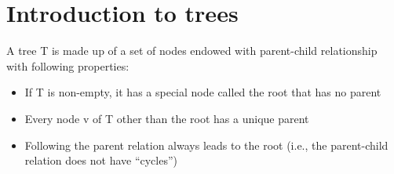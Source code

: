 \documentclass[12pt]{article}
\newcommand{\1}{\space \quad}
\newcommand{\2}{\quad \quad \quad}
\newcommand{\3}{\quad \quad \quad \quad \space}
\newcommand{\4}{\quad \quad \quad \quad \quad \quad}
\begin{document}
\section{Introduction to trees}
A tree T is made up of a set of nodes endowed with parent-child relationship with following properties:
\begin{itemize}
  \item If T is non-empty, it has a special node called the root that has no parent
  \item Every node v of T other than the root has a unique parent
  \item Following the parent relation always leads to the root (i.e., the parent-child relation does not have “cycles”)
\end{itemize}
\end{document}
